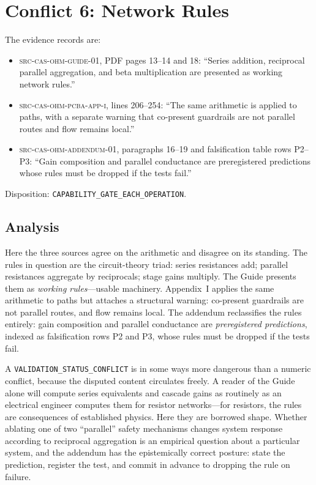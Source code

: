 \section{Conflict 6: Network Rules}\label{ch04:networks}

\begin{conflict}\label{ch04:conf:networks}
The evidence records are:
\begin{itemize}
\item \textsc{src-cas-ohm-guide-01}, PDF pages 13--14 and 18: ``Series
addition, reciprocal parallel aggregation, and beta multiplication are
presented as working network rules.''
\item \textsc{src-cas-ohm-pcba-app-i}, lines 206--254: ``The same arithmetic
is applied to paths, with a separate warning that co-present guardrails are
not parallel routes and flow remains local.''
\item \textsc{src-cas-ohm-addendum-01}, paragraphs 16--19 and falsification
table rows P2--P3: ``Gain composition and parallel conductance are
preregistered predictions whose rules must be dropped if the tests fail.''
\end{itemize}
Disposition: \texttt{CAPABILITY\_GATE\_EACH\_OPERATION}.
\end{conflict}

\subsection{Analysis}

Here the three sources agree on the arithmetic and disagree on its standing.
The rules in question are the circuit-theory triad: series resistances add;
parallel resistances aggregate by reciprocals; stage gains multiply. The
Guide presents them as \emph{working rules}---usable machinery. Appendix~I
applies the same arithmetic to paths but attaches a structural warning:
co-present guardrails are not parallel routes, and flow remains local. The
addendum reclassifies the rules entirely: gain composition and parallel
conductance are \emph{preregistered predictions}, indexed as falsification
rows P2 and P3, whose rules must be dropped if the tests fail.

A \texttt{VALIDATION\_STATUS\_CONFLICT} is in some ways more dangerous than a
numeric conflict, because the disputed content circulates freely. A reader of
the Guide alone will compute series equivalents and cascade gains as
routinely as an electrical engineer computes them for resistor networks---for
resistors, the rules are consequences of established physics. Here they are
borrowed shape. Whether ablating one of two ``parallel'' safety mechanisms
changes system response according to reciprocal aggregation is an empirical
question about a particular system, and the addendum has the epistemically
correct posture: state the prediction, register the test, and commit in
advance to dropping the rule on failure.

